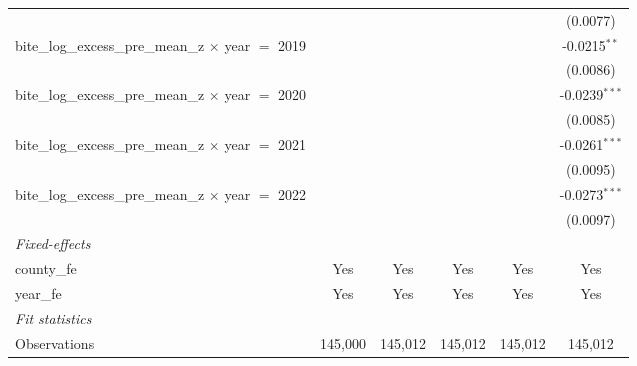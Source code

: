 \begin{tabular}{lccccc}
                                                                &                    &                 &                       &                            & (0.0077)\\   
   bite\_log\_excess\_pre\_mean\_z $\times$ year $=$ 2019       &                    &                 &                       &                            & -0.0215$^{**}$\\   
                                                                &                    &                 &                       &                            & (0.0086)\\   
   bite\_log\_excess\_pre\_mean\_z $\times$ year $=$ 2020       &                    &                 &                       &                            & -0.0239$^{***}$\\   
                                                                &                    &                 &                       &                            & (0.0085)\\   
   bite\_log\_excess\_pre\_mean\_z $\times$ year $=$ 2021       &                    &                 &                       &                            & -0.0261$^{***}$\\   
                                                                &                    &                 &                       &                            & (0.0095)\\   
   bite\_log\_excess\_pre\_mean\_z $\times$ year $=$ 2022       &                    &                 &                       &                            & -0.0273$^{***}$\\   
                                                                &                    &                 &                       &                            & (0.0097)\\   
   \midrule
   \emph{Fixed-effects}\\
   county\_fe                                                   & Yes                & Yes             & Yes                   & Yes                        & Yes\\  
   year\_fe                                                     & Yes                & Yes             & Yes                   & Yes                        & Yes\\  
   \midrule
   \emph{Fit statistics}\\
   Observations                                                 & 145,000            & 145,012         & 145,012               & 145,012                    & 145,012\\  

\end{tabular}
